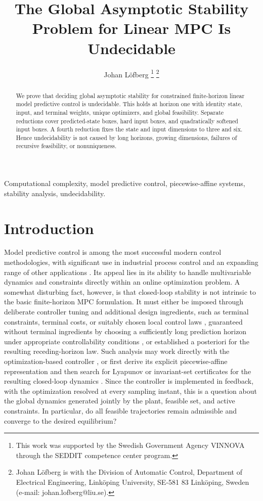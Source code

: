 \documentclass{IEEEtran}
\title{The Global Asymptotic Stability Problem for Linear MPC Is Undecidable}
\author{Johan Löfberg%
\thanks{This work was supported by the Swedish Government Agency VINNOVA
through the SEDDIT competence center program.}%
\thanks{Johan Löfberg is with the Division of Automatic Control, Department
of Electrical Engineering, Linköping University, SE-581 83 Linköping,
Sweden (e-mail: johan.lofberg@liu.se).}}
\theoremstyle{remark}
\begin{document}
\maketitle

\begin{abstract}
We prove that deciding global asymptotic stability for constrained finite-horizon linear model predictive control is undecidable. This holds at horizon one with identity state, input, and terminal weights, unique optimizers, and global feasibility. Separate reductions cover predicted-state boxes, hard input boxes, and quadratically softened input boxes. A fourth reduction fixes the state and input dimensions to three and six. Hence undecidability is not caused by long horizons, growing dimensions, failures of recursive feasibility, or nonuniqueness.
\end{abstract}

\begin{IEEEkeywords}
Computational complexity, model predictive control, piecewise-affine systems,
stability analysis, undecidability.
\end{IEEEkeywords}

\section{Introduction}

Model predictive control is among the most successful modern control methodologies, with significant use in industrial process control and an expanding range of other applications \cite{GarciaEtAl1989,QinBadgwell2003,RawlingsMayneDiehl2024}.  Its appeal lies in its ability to handle multivariable dynamics and constraints directly within an online optimization problem.  A somewhat disturbing fact, however, is that closed-loop stability is not intrinsic to the basic finite-horizon MPC formulation.  It must either be imposed through deliberate controller tuning and additional design ingredients, such as terminal constraints, terminal costs, or suitably chosen local control laws \cite{MayneEtAl2000,ScokaertEtAl1999}, guaranteed without terminal ingredients by choosing a sufficiently long prediction horizon under appropriate controllability conditions \cite{Gruene2012}, or established a posteriori for the resulting receding-horizon law.  Such analysis may work directly with the optimization-based controller \cite{Primbs2001,KordaJones2017,Lofberg2012,SimonLofberg2016}, or first derive its explicit piecewise-affine representation \cite{BemporadEtAl2002} and then search for Lyapunov or invariant-set certificates for the resulting closed-loop dynamics \cite{FerrariTrecateEtAl2002,HovdOlaru2010,RubagottiEtAl2011,GroffEtAl2023}.  Since the controller is implemented in feedback, with the optimization resolved at every sampling instant, this is a question about the global dynamics generated jointly by the plant, feasible set, and active constraints.  In particular, do all feasible trajectories remain admissible and converge to the desired equilibrium?
\end{document}
